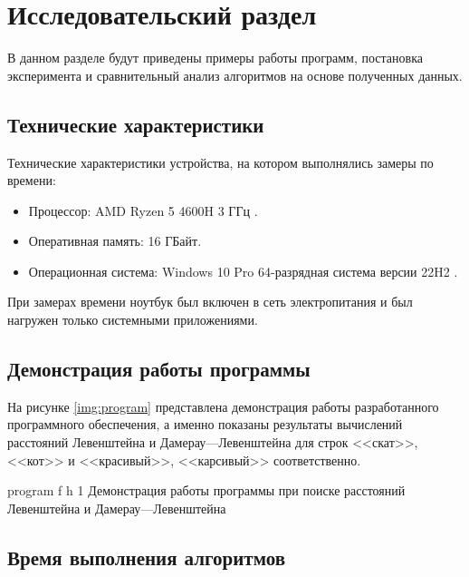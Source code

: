 \chapter{Исследовательский раздел}

В данном разделе будут приведены примеры работы программ, постановка эксперимента и сравнительный анализ алгоритмов на основе полученных данных.


\section{Технические характеристики}

Технические характеристики устройства, на котором выполнялись замеры по времени:

\begin{itemize}
	\item Процессор: AMD Ryzen 5 4600H 3 ГГц \cite{amd}.
	\item Оперативная память: 16 ГБайт.
	\item Операционная система: Windows 10 Pro 64-разрядная система версии 22H2 \cite{windows}.
\end{itemize}

При замерах времени ноутбук был включен в сеть электропитания и был нагружен только системными приложениями.


\section{Демонстрация работы программы}

На рисунке \ref{img:program} представлена демонстрация работы разработанного программного обеспечения, а именно показаны результаты вычислений расстояний Левенштейна и Дамерау---Левенштейна для строк <<скат>>, <<кот>> и <<красивый>>, <<карсивый>> соответственно.  
\clearpage

{program} %
{f} %
{h} %
{1\textwidth} %
{Демонстрация работы программы при поиске расстояний Левенштейна и Дамерау---Левенштейна} %

\clearpage

\section{Время выполнения алгоритмов}

